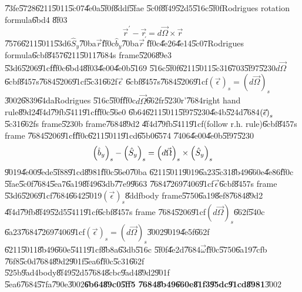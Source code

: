 \documentclass[12pt,a4paper]{article}
\begin{document}
\U{73fe}\U{5728}\U{6211}\U{5011}\U{5c07}\U{4e0a}\U{5f0f}\U{8ddf}\U{5fae}%
\U{5c0f}\U{8f49}\U{52d5}\U{516c}\U{5f0f}Rodrigues rotation formula\U{6bd4}%
\U{8f03}%
\begin{equation*}
\vec{r}^{\prime }-\vec{r}=d\vec{\Omega}\times \vec{r}
\end{equation*}%
\U{7576}\U{6211}\U{5011}\U{53d6}$\hat{S}_{y}$\U{70ba}$\vec{r}$\U{ff0c}$\hat{b%
}_{y}$\U{70ba}$\vec{r}^{\prime }$\U{ff0c}\U{4e26}\U{4e14}\U{5c07}Rodrigues
formula\U{6cbf}\U{8457}\U{6211}\U{5011}\U{7684}s frame\U{5206}\U{89e3}%
\U{53d6}\U{5206}\U{91cf}\U{ff0c}\U{6bd4}\U{8f03}\U{4e00}\U{4e0b}\U{5169}%
\U{516c}\U{5f0f}\U{6211}\U{5011}\U{5c31}\U{6703}\U{5f97}\U{5230}$d\vec{\Omega%
}$\U{6cbf}\U{8457}s\U{7684}\U{5206}\U{91cf}\U{5c31}\U{662f}$\vec{\epsilon}$%
\U{6cbf}\U{8457}s\U{7684}\U{5206}\U{91cf}$\left( \vec{\epsilon}\right)
_{s}=\left( d\vec{\Omega}\right) _{s}$\U{3002}\U{6839}\U{64da}Rodrigues%
\U{516c}\U{5f0f}\U{ff0c}$d\vec{\Omega}$\U{662f}r\U{5230}r'\U{7684}right hand
rule\U{89d2}\U{4f4d}\U{79fb}\U{5411}\U{91cf}\thinspace \U{ff0c}\U{56e0}%
\U{6b64}\U{6211}\U{5011}\U{5f97}\U{5230}\U{4e4b}\U{524d}\U{7684}$\left( \vec{%
\epsilon}\right) _{s}$\U{5c31}\U{662f}s frame\U{5230}b frame\U{7684}\U{89d2}%
\U{4f4d}\U{79fb}\U{5411}\U{91cf}(follow r.h. rule)\U{6cbf}\U{8457}s frame%
\U{7684}\U{5206}\U{91cf}\U{ff0c}\U{6211}\U{5011}\U{91cd}\U{65b0}\U{6574}%
\U{7406}\U{4e00}\U{4e0b}\U{5f97}\U{5230}%
\begin{equation*}
\left( \hat{b}_{y}\right) _{s}-\left( \hat{S}_{y}\right) _{s}=\left( d\vec{%
\Omega}\right) _{s}\times \left( \hat{S}_{y}\right) _{s}
\end{equation*}%
\U{9019}\U{4e00}\U{9ede}\U{5f88}\U{91cd}\U{8981}\U{ff0c}\U{56e0}\U{70ba}%
\U{6211}\U{5011}\U{9019}\U{6a23}\U{5c31}\U{8b49}\U{660e}\U{4e86}\U{ff0c}%
\U{5fae}\U{5c0f}\U{7684}\U{5ea7}\U{6a19}\U{8f49}\U{63db}\U{77e9}\U{9663}%
\U{7684}\U{7269}\U{7406}\U{91cf}$\vec{\epsilon}$\U{6cbf}\U{8457}s frame%
\U{53d6}\U{5206}\U{91cf}\U{7684}\U{6642}\U{5019}$\left( \vec{\epsilon}%
\right) _{s}$\U{8ddf}body frame\U{5750}\U{6a19}\U{8ef8}\U{7684}\U{89d2}%
\U{4f4d}\U{79fb}\U{8f49}\U{52d5}\U{5411}\U{91cf}\U{6cbf}\U{8457}s frame%
\U{7684}\U{5206}\U{91cf}$\left( d\vec{\Omega}\right) _{s}$\U{662f}\U{540c}%
\U{6a23}\U{7684}\U{7269}\U{7406}\U{91cf}$\left( \vec{\epsilon}\right)
_{s}=\left( d\vec{\Omega}\right) _{s}$\U{3002}\U{9019}\U{4e5f}\U{662f}%
\U{6211}\U{5011}\U{8b49}\U{660e}\U{5411}\U{91cf}\U{8b8a}\U{63db}\U{516c}%
\U{5f0f}\U{4e2d}\U{7684}$\vec{\omega}$\U{ff0c}\U{5750}\U{6a19}\U{7cfb}%
\U{76f8}\U{5c0d}\U{7684}\U{89d2}\U{901f}\U{5ea6}\U{ff0c}\U{5c31}\U{662f}%
\U{525b}\U{9ad4}body\U{8f49}\U{52d5}\U{7684}\U{8cbc}\U{9ad4}\U{89d2}\U{901f}%
\U{5ea6}\U{7684}\U{57fa}\U{790e}\U{3002}\textbf{\U{6b64}\U{89c0}\U{5ff5}%
\U{7684}\U{8b49}\U{660e}\U{81f3}\U{95dc}\U{91cd}\U{8981}}\U{3002}
\end{document}
